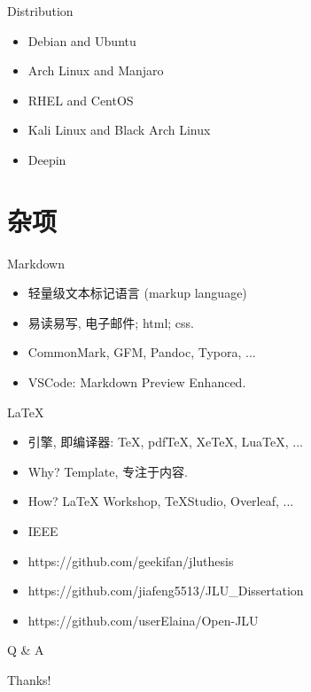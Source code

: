 \documentclass{beamer}
\begin{document}
\begin{frame}{Distribution}
    \begin{itemize}
        \item Debian and Ubuntu
        \item Arch Linux and Manjaro
        \item RHEL and CentOS
        \item Kali Linux and Black Arch Linux
        \item Deepin
    \end{itemize}
\end{frame}




\section{杂项}

\begin{frame}{Markdown}
    \begin{itemize}
        \item 轻量级文本标记语言 (markup language)
        \item 易读易写, 电子邮件; html; css.
        \item CommonMark, GFM, Pandoc, Typora, ...
        \item VSCode: Markdown Preview Enhanced.
    \end{itemize}
\end{frame}

\begin{frame}{LaTeX}
    \begin{itemize}
        \item 引擎, 即编译器: TeX, pdfTeX, XeTeX, LuaTeX, ...
        \item Why? Template, 专注于内容.
        \item How? LaTeX Workshop, TeXStudio, Overleaf, ...
        \item IEEE
        \item https://github.com/geekifan/jluthesis
        \item https://github.com/jiafeng5513/JLU\_Dissertation
        \item https://github.com/userElaina/Open-JLU
    \end{itemize}
\end{frame}

\begin{frame}{Q \& A}
    \begin{center}
        {\Huge\calligra Thanks!}
    \end{center}
\end{frame}
\end{document}
